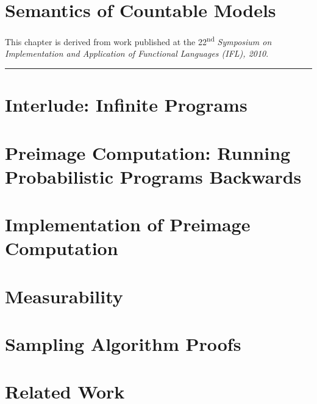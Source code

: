 \documentclass[phd,electronic,twosidetoc,letterpaper,chaptercenter,parttop,lof]{byumsphd}
\begin{document}



\chapter{Semantics of Countable Models}

This chapter is derived from work published at the 22\textsuperscript{nd} \emph{Symposium on Implementation and Application of Functional Languages (IFL), 2010}.

\vspace{\baselineskip}
\hrule
\vspace{\baselineskip}



\chapter{Interlude: Infinite Programs}




\chapter{Preimage Computation: Running Probabilistic Programs Backwards}




\chapter{Implementation of Preimage Computation}




\chapter{Measurability}
\label{ch:measurability}




\chapter{Sampling Algorithm Proofs}
\label{ch:sampling-algorithm-proofs}




\chapter{Related Work}




\end{document}
